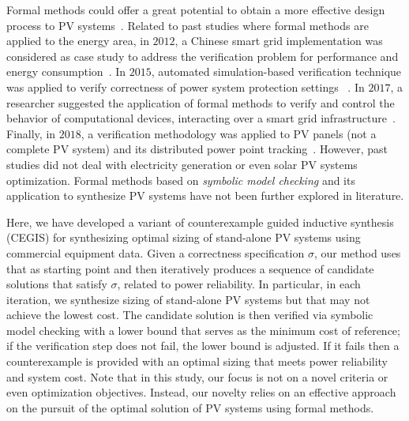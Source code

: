 \documentclass[journal]{IEEEtran}
\begin{document}
Formal methods could offer a great potential to obtain a more effective design process to PV systems~\cite{ClarkeHV18}. Related to past studies where formal methods are applied to the energy area, in $2012$, a Chinese smart grid implementation was considered as case study to address the verification problem for performance and energy consumption~\cite{Yukseletall2012}. In $2015$, automated simulation-based verification technique was applied to verify correctness of power system protection settings ~\cite{Sengupta2015}. In $2017$, a researcher suggested the application of formal methods to verify and control the behavior of computational devices, interacting over a smart grid  infrastructure~\cite{Abate2017}. Finally, in $2018$, a verification methodology was applied to PV panels (not a complete PV system) and its distributed power point tracking~\cite{Driouich2018}. However, past studies did not deal with electricity generation or even solar PV systems optimization. Formal methods based on \textit{symbolic model checking} and its application to synthesize PV systems have not been further explored in literature.
 
Here, we have developed a variant of counterexample guided inductive synthesis (CEGIS) for synthesizing optimal sizing of stand-alone PV systems using commercial equipment data. Given a correctness specification $\sigma$, our method uses that as starting point and then iteratively produces a sequence of candidate solutions that satisfy $\sigma$, related to power reliability. In particular, in each iteration, we synthesize sizing of stand-alone PV systems but that may not achieve the lowest cost. The candidate solution is then verified via symbolic model checking with a lower bound that serves as the minimum cost of reference; if the verification step does not fail, the lower bound is adjusted. If it fails then a counterexample is provided with an optimal sizing that meets power reliability and system cost. Note that in this study, our focus is not on a novel criteria or even optimization objectives. Instead, our novelty relies on an effective approach on the pursuit of the optimal solution of PV systems using formal methods. %
\end{document}
